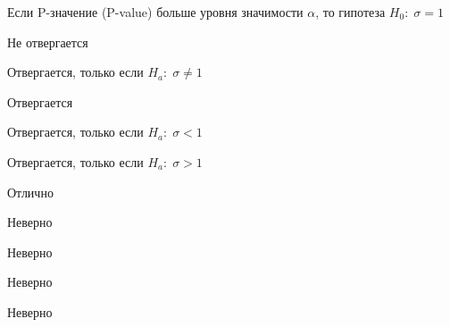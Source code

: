 
\begin{question}
Если P-значение (P-value) больше уровня значимости \(\alpha\), то
гипотеза \(H_0: \; \sigma=1\)
\begin{answerlist}
  \item Не отвергается
  \item Отвергается, только если \(H_a: \; \sigma\neq 1\)
  \item Отвергается
  \item Отвергается, только если \(H_a: \; \sigma<1\)
  \item Отвергается, только если \(H_a: \; \sigma>1\)
\end{answerlist}
\end{question}

\begin{solution}
\begin{answerlist}
  \item Отлично
  \item Неверно
  \item Неверно
  \item Неверно
  \item Неверно
\end{answerlist}
\end{solution}

